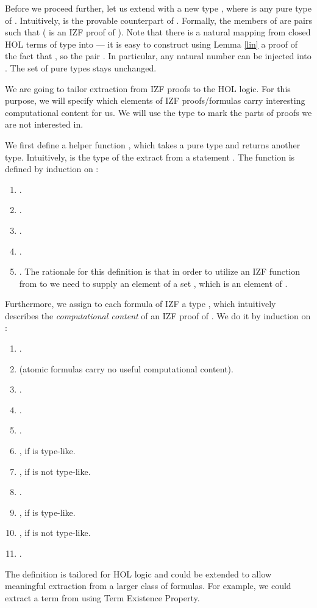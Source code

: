 \documentclass{LMCS}
\begin{document}
Before we proceed further, let us extend  with a new type ,
where  is any pure type of . Intuitively,  is the
provable counterpart of . Formally, the members of 
 are pairs  such that  
( is an IZF proof of ). 
Note that there is a natural mapping from closed HOL terms  of type  into
 --- it is easy to construct using Lemma \ref{lin} a proof  of
the fact that , so the pair .
In particular, any natural number  can be injected into . The
set of pure types stays unchanged. 

We are going to tailor extraction from IZF proofs to the HOL logic. For this purpose, we
will specify which elements of IZF proofs/formulas carry interesting
computational content for us. We will use the type  to mark the parts of
proofs we are not interested in.

We first define a helper function , which takes a pure type  and
returns another type. Intuitively,  is the type of the extract from
a statement . The function  is defined by induction on :
\begin{enumerate}[]
\item . 
\item .
\item . 
\item . 
\item . The rationale for this
definition is that in order to utilize an IZF function from  to  we need to supply an element
of a set , which is an element of . 
\end{enumerate}

Furthermore, we assign to each formula  of IZF a  type ,
which intuitively describes the \emph{computational content} of an IZF proof of
. We do it by induction on :

\begin{enumerate}[]
\item . 
\item  (atomic formulas carry no useful computational content). 
\item .
\item .
\item .
\item , if  is
type-like. 
\item , if  is not type-like.
\item .
\item , if  is type-like. 
\item , if  is not type-like. 
\item .
\end{enumerate}

The definition is tailored for HOL logic and could be extended to allow meaningful extraction from
a larger class of formulas. For example, we could extract a term from  using Term Existence Property. 
\end{document}
